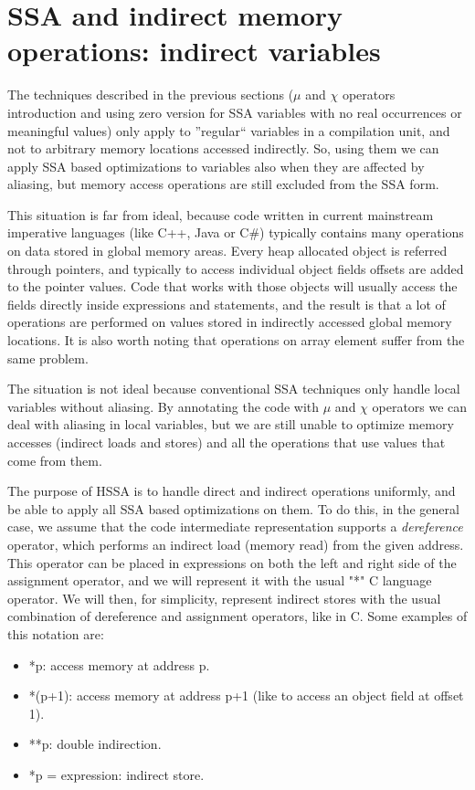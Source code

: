 \section{SSA and indirect memory operations: indirect variables}

The techniques described in the previous sections ($\mu$ and $\chi$ operators introduction and using zero version for SSA variables with no real occurrences or meaningful values) only apply to ''regular`` variables in a compilation unit, and not to arbitrary memory locations accessed indirectly.
So, using them we can apply SSA based optimizations to variables also when they are affected by aliasing, but memory access operations are still excluded from the SSA form.

This situation is far from ideal, because code written in current mainstream imperative languages (like C++, Java or C\#) typically contains many operations on data stored in global memory areas.
Every heap allocated object is referred through pointers, and typically to access individual object fields offsets are added to the pointer values. Code that works with those objects will usually access the fields directly inside expressions and statements, and the result is that a lot of operations are performed on values stored in indirectly accessed global memory locations.
It is also worth noting that operations on array element suffer from the same problem.

The situation is not ideal because conventional SSA techniques only handle local variables without aliasing. By annotating the code with $\mu$ and $\chi$ operators we can deal with aliasing in local variables, but we are still unable to optimize memory accesses (indirect loads and stores) and all the operations that use values that come from them.

The purpose of HSSA is to handle direct and indirect operations uniformly, and be able to apply all SSA based optimizations on them.
To do this, in the general case, we assume that the code intermediate representation supports a {\em dereference} operator, which performs an indirect load (memory read) from the given address. This operator can be placed in expressions on both the left and right side of the assignment operator, and we will represent it with the usual "*" C language operator. We will then, for simplicity, represent indirect stores with the usual combination of dereference and assignment operators, like in C.
Some examples of this notation are:
\begin{itemize}
\item *p: access memory at address p.
\item *(p+1): access memory at address p+1 (like to access an object field at offset 1).
\item **p: double indirection.
\item *p = expression: indirect store.
\end{itemize}

